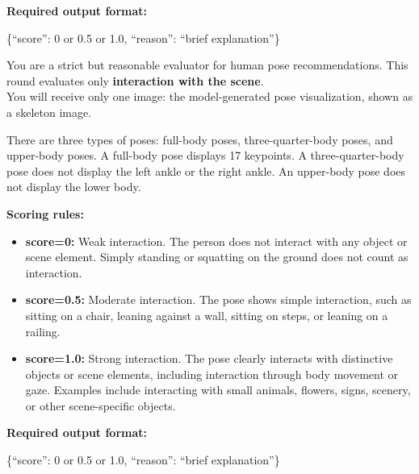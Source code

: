 \documentclass{llmxive}
\begin{document}
\begin{promptbox}
\textbf{Required output format:}
\begin{flushleft}
\ttfamily\footnotesize
\{``score'': 0 or 0.5 or 1.0, ``reason'': ``brief explanation''\}
\end{flushleft}

\end{promptbox}


\begin{promptbox}
\small

You are a strict but reasonable evaluator for human pose recommendations. This round evaluates only \textbf{interaction with the scene}.\\

You will receive only one image: the model-generated pose visualization, shown as a skeleton image.

There are three types of poses: full-body poses, three-quarter-body poses, and upper-body poses. A full-body pose displays 17 keypoints. A three-quarter-body pose does not display the left ankle or the right ankle. An upper-body pose does not display the lower body.

\textbf{Scoring rules:}
\begin{itemize}
    \item \textbf{score=0:} Weak interaction. The person does not interact with any object or scene element. Simply standing or squatting on the ground does not count as interaction.
    \item \textbf{score=0.5:} Moderate interaction. The pose shows simple interaction, such as sitting on a chair, leaning against a wall, sitting on steps, or leaning on a railing.
    \item \textbf{score=1.0:} Strong interaction. The pose clearly interacts with distinctive objects or scene elements, including interaction through body movement or gaze. Examples include interacting with small animals, flowers, signs, scenery, or other scene-specific objects.
\end{itemize}

\textbf{Required output format:}
\begin{flushleft}
\ttfamily\footnotesize
\{``score'': 0 or 0.5 or 1.0, ``reason'': ``brief explanation''\}
\end{flushleft}

\end{promptbox}
\end{document}
